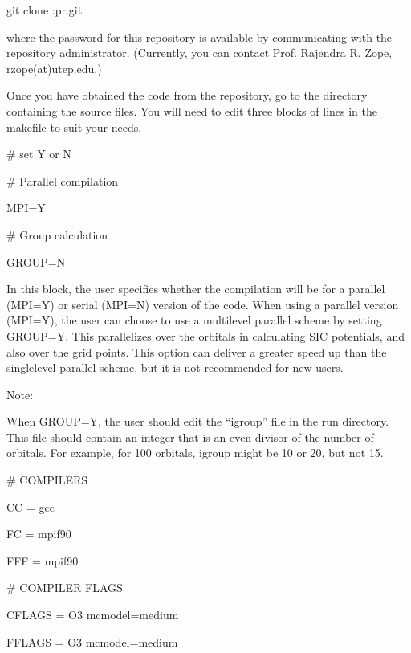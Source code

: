\documentclass[letterpaper,10pt,english,openany,oneside]{sphinxmanual}
\begin{document}
\sphinxAtStartPar
git clone :pr.git

\sphinxAtStartPar
where the password for this repository is available by communicating with the repository administrator.
(Currently, you can contact Prof. Rajendra R. Zope, rzope(at)utep.edu.)

\sphinxAtStartPar
Once you have obtained the code from the repository, go to the directory containing the source files.  You will
need to edit three blocks of lines in the makefile to suit your needs.

\sphinxAtStartPar
{}

\sphinxAtStartPar
\# set Y or N

\sphinxAtStartPar
\# Parallel compilation

\sphinxAtStartPar
MPI=Y

\sphinxAtStartPar
\# Group calculation

\sphinxAtStartPar
GROUP=N

\sphinxAtStartPar
In this block, the user specifies whether the compilation will be for a parallel (MPI=Y) or serial (MPI=N) version of the code.
When using a parallel version (MPI=Y), the user can choose to use a multi\sphinxhyphen{}level parallel scheme by setting GROUP=Y.
This parallelizes over the orbitals in calculating SIC potentials, and also over the grid points.
This option can deliver a greater speed up than the single\sphinxhyphen{}level parallel scheme, but it is not recommended for new users.

\sphinxAtStartPar
Note:

\sphinxAtStartPar
When GROUP=Y, the user should edit the “igroup” file in the run directory.  This file should contain an integer that is
an even divisor of the number of orbitals. For example, for 100 orbitals, igroup might be 10 or 20, but not 15.

\sphinxAtStartPar
{}

\sphinxAtStartPar
\# COMPILERS

\sphinxAtStartPar
CC = gcc

\sphinxAtStartPar
FC = mpif90

\sphinxAtStartPar
FFF = mpif90

\sphinxAtStartPar
\# COMPILER FLAGS

\sphinxAtStartPar
CFLAGS = \sphinxhyphen{}O3 \sphinxhyphen{}mcmodel=medium

\sphinxAtStartPar
FFLAGS = \sphinxhyphen{}O3 \sphinxhyphen{}mcmodel=medium
\end{document}
